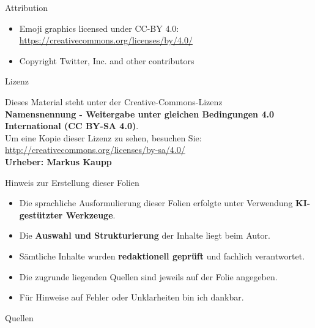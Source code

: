 
\begin{frame}{Attribution}
\begin{itemize}
    \item Emoji graphics licensed under CC-BY 4.0: 
    \url{https://creativecommons.org/licenses/by/4.0/}
    \item Copyright Twitter, Inc. and other contributors
\end{itemize}
\end{frame}

\begin{frame}{Lizenz}
\begin{center}
            
\end{center}

\begin{center}
\footnotesize
Dieses Material steht unter der Creative-Commons-Lizenz \\
\textbf{Namensnennung - Weitergabe unter gleichen Bedingungen 4.0 International (CC BY-SA 4.0)}. \\[0.3cm]
Um eine Kopie dieser Lizenz zu sehen, besuchen Sie: \\
\url{http://creativecommons.org/licenses/by-sa/4.0/} \\[0.3cm]
\textbf{Urheber: Markus Kaupp}
\end{center}
\end{frame}

\begin{frame}{Hinweis zur Erstellung dieser Folien}
\begin{itemize}
  \item Die sprachliche Ausformulierung dieser Folien erfolgte unter Verwendung \textbf{KI-gestützter Werkzeuge}.
  \item Die \textbf{Auswahl und Strukturierung} der Inhalte liegt beim Autor.
  \item Sämtliche Inhalte wurden \textbf{redaktionell geprüft} und fachlich verantwortet.
  \item Die zugrunde liegenden Quellen sind jeweils auf der Folie angegeben.
  \item Für Hinweise auf Fehler oder Unklarheiten bin ich dankbar.
\end{itemize}
\end{frame}

\begin{frame}[allowframebreaks]{Quellen}
    
     {\scriptsize
        \printbibliography
    }
\end{frame}